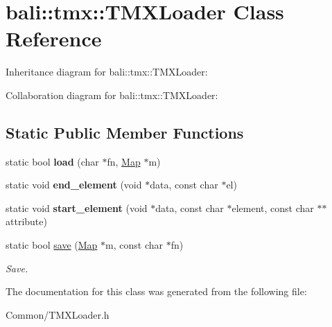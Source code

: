 \hypertarget{classbali_1_1tmx_1_1_t_m_x_loader}{\section{bali\-:\-:tmx\-:\-:T\-M\-X\-Loader Class Reference}
\label{classbali_1_1tmx_1_1_t_m_x_loader}
}


Inheritance diagram for bali\-:\-:tmx\-:\-:T\-M\-X\-Loader\-:


Collaboration diagram for bali\-:\-:tmx\-:\-:T\-M\-X\-Loader\-:
\subsection*{Static Public Member Functions}
\begin{DoxyCompactItemize}
\item 
\hypertarget{classbali_1_1tmx_1_1_t_m_x_loader_a4ee92b5eb6b15a19f6939718efa919aa}{static bool {\bfseries load} (char $\ast$fn, \hyperlink{classbali_1_1tmx_1_1_map}{Map} $\ast$m)}\label{classbali_1_1tmx_1_1_t_m_x_loader_a4ee92b5eb6b15a19f6939718efa919aa}

\item 
\hypertarget{classbali_1_1tmx_1_1_t_m_x_loader_a84cef01457b6c869332c91b8126d2ebc}{static void {\bfseries end\-\_\-element} (void $\ast$data, const char $\ast$el)}\label{classbali_1_1tmx_1_1_t_m_x_loader_a84cef01457b6c869332c91b8126d2ebc}

\item 
\hypertarget{classbali_1_1tmx_1_1_t_m_x_loader_aa6266a84635b64cc0d30a60e5c7bb7a9}{static void {\bfseries start\-\_\-element} (void $\ast$data, const char $\ast$element, const char $\ast$$\ast$attribute)}\label{classbali_1_1tmx_1_1_t_m_x_loader_aa6266a84635b64cc0d30a60e5c7bb7a9}

\item 
\hypertarget{classbali_1_1tmx_1_1_t_m_x_loader_a685f5c5bb237e2fb7d2a5d1f454c087c}{static bool \hyperlink{classbali_1_1tmx_1_1_t_m_x_loader_a685f5c5bb237e2fb7d2a5d1f454c087c}{save} (\hyperlink{classbali_1_1tmx_1_1_map}{Map} $\ast$m, const char $\ast$fn)}\label{classbali_1_1tmx_1_1_t_m_x_loader_a685f5c5bb237e2fb7d2a5d1f454c087c}

\begin{DoxyCompactList}\small\item\em Save. \end{DoxyCompactList}\end{DoxyCompactItemize}


The documentation for this class was generated from the following file\-:\begin{DoxyCompactItemize}
\item 
Common/T\-M\-X\-Loader.\-h\end{DoxyCompactItemize}
